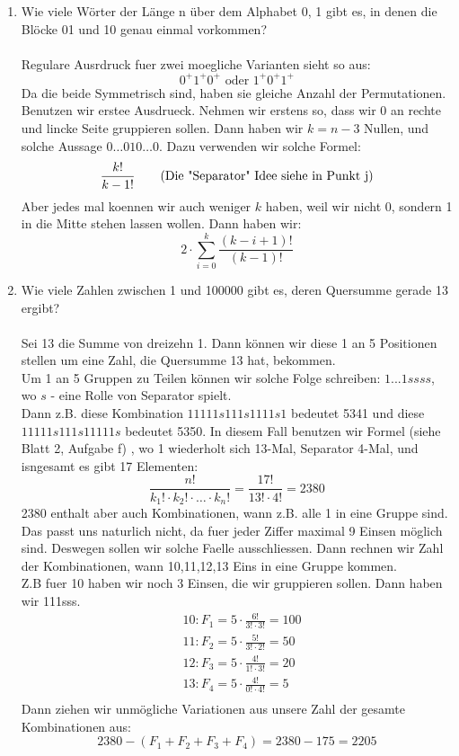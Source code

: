 \begin{enumerate}[label=(\alph*)]
        \item Wie viele Wörter der Länge n über dem Alphabet {0, 1} gibt es, in 
        denen die Blöcke 01 und 10 genau einmal vorkommen?\\\\
        Regulare Ausrdruck fuer zwei moegliche Varianten sieht so aus:\\
        \[ 0^+1^+0^+\textrm{ oder } 1^+0^+1^+ \]
        Da die beide Symmetrisch sind, haben sie gleiche Anzahl der Permutationen.
        Benutzen wir erstee Ausdrueck. Nehmen wir erstens so, dass wir 0 an rechte 
        und lincke Seite gruppieren sollen. Dann haben wir $k=n-3$ Nullen, und 
        solche Aussage $0\ldots010\ldots0$. Dazu verwenden wir solche Formel:
        \[\frac{k!}{k-1!} \textrm{\qquad(Die "Separator" Idee siehe in Punkt j)}\]
        Aber jedes mal koennen wir auch weniger $k$ haben, weil wir nicht 0,
        sondern 1 in die Mitte stehen lassen wollen. Dann haben wir: 
        \[2\cdot\sum_{i=0}^k \frac{(k-i+1)!}{(k-1)!}\] 

        \item Wie viele Zahlen zwischen 1 und 100000 gibt es, deren Quersumme gerade 13 ergibt?\\\\
        Sei 13 die Summe von dreizehn 1. Dann k\"onnen wir diese 1 an 5 Positionen 
        stellen um eine Zahl, die Quersumme 13 hat, bekommen.\\
        Um 1 an 5 Gruppen zu Teilen k\"onnen wir solche Folge schreiben:
        $1...1 s s s s$, wo $s$ - eine Rolle von Separator spielt.\\ Dann z.B. diese
        Kombination $11111s111s1111s1$ bedeutet 5341 und diese $11111s111s11111s$
        bedeutet 5350. In diesem Fall benutzen wir Formel (siehe Blatt 2, Aufgabe f)
        , wo 1 wiederholt sich 13-Mal, Separator 4-Mal, und isngesamt es gibt 17 Elementen:
        \[\frac{n!}{k_1!\cdot k_2!\cdot\ldots\cdot k_n!} = \frac{17!}{13!\cdot4!} = 2380\]
        2380 enthalt aber auch Kombinationen, wann z.B. alle 1 in eine Gruppe sind. 
        Das passt uns naturlich nicht, da fuer jeder Ziffer maximal 9 Einsen m\"oglich sind.
        Deswegen sollen wir solche Faelle ausschliessen. Dann rechnen wir Zahl der 
        Kombinationen, wann 10,11,12,13 Eins in eine Gruppe kommen. \\
        Z.B fuer 10 haben wir noch 3 Einsen, die wir gruppieren sollen. Dann haben wir 111sss.
        \begin{align*}
        	&10: F_1 = 5 \cdot \frac{6!}{3!\cdot3!} = 100\\
        	&11: F_2 = 5 \cdot \frac{5!}{3!\cdot2!} = 50\\
        	&12: F_3 = 5 \cdot \frac{4!}{1!\cdot3!} = 20\\
        	&13: F_4 = 5 \cdot \frac{4!}{0!\cdot4!} = 5\\
        \end{align*}
        Dann ziehen wir unm\"ogliche Variationen aus unsere Zahl der gesamte Kombinationen aus:
        \[2380 - (F_1+F_2+F_3+F_4) = 2380 - 175 = 2205\]
    \end{enumerate}
